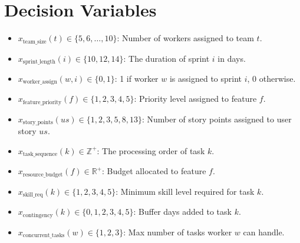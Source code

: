 \documentclass[11pt]{article}
\begin{document}
\section{Decision Variables}
\begin{itemize}
    \item $x_{\text{team\_size}}(t) \in \{5, 6, \dots, 10\}$: Number of workers assigned to team $t$.
    \item $x_{\text{sprint\_length}}(i) \in \{10, 12, 14\}$: The duration of sprint $i$ in days.
    \item $x_{\text{worker\_assign}}(w, i) \in \{0, 1\}$: 1 if worker $w$ is assigned to sprint $i$, 0 otherwise.
    \item $x_{\text{feature\_priority}}(f) \in \{1, 2, 3, 4, 5\}$: Priority level assigned to feature $f$.
    \item $x_{\text{story\_points}}(us) \in \{1, 2, 3, 5, 8, 13\}$: Number of story points assigned to user story $us$.
    \item $x_{\text{task\_sequence}}(k) \in \mathbb{Z}^+$: The processing order of task $k$.
    \item $x_{\text{resource\_budget}}(f) \in \mathbb{R}^+$: Budget allocated to feature $f$.
    \item $x_{\text{skill\_req}}(k) \in \{1, 2, 3, 4, 5\}$: Minimum skill level required for task $k$.
    \item $x_{\text{contingency}}(k) \in \{0, 1, 2, 3, 4, 5\}$: Buffer days added to task $k$.
    \item $x_{\text{concurrent\_tasks}}(w) \in \{1, 2, 3\}$: Max number of tasks worker $w$ can handle.
\end{itemize}
\end{document}
